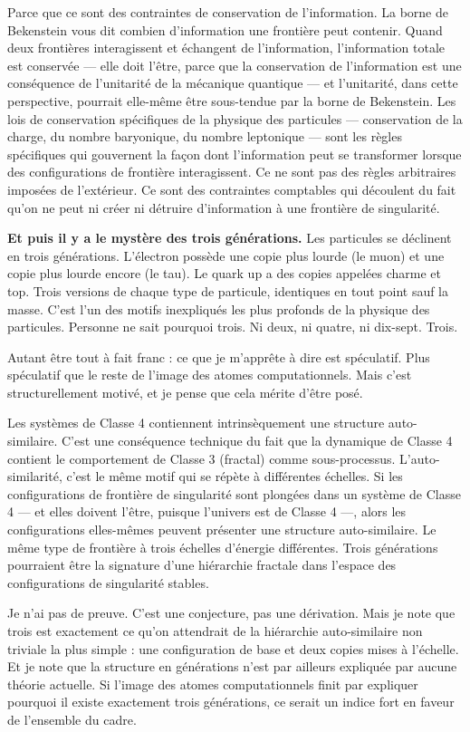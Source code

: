 \documentclass[11pt, twoside, openright]{book}
\begin{document}
Parce que ce sont des contraintes de conservation de l'information. La borne de Bekenstein vous dit combien d'information une frontière peut contenir. Quand deux frontières interagissent et échangent de l'information, l'information totale est conservée --- elle doit l'être, parce que la conservation de l'information est une conséquence de l'unitarité de la mécanique quantique --- et l'unitarité, dans cette perspective, pourrait elle-même être sous-tendue par la borne de Bekenstein. Les lois de conservation spécifiques de la physique des particules --- conservation de la charge, du nombre baryonique, du nombre leptonique --- sont les règles spécifiques qui gouvernent la façon dont l'information peut se transformer lorsque des configurations de frontière interagissent. Ce ne sont pas des règles arbitraires imposées de l'extérieur. Ce sont des contraintes comptables qui découlent du fait qu'on ne peut ni créer ni détruire d'information à une frontière de singularité.

\textbf{Et puis il y a le mystère des trois générations.} Les particules se déclinent en trois générations. L'électron possède une copie plus lourde (le muon) et une copie plus lourde encore (le tau). Le quark up a des copies appelées charme et top. Trois versions de chaque type de particule, identiques en tout point sauf la masse. C'est l'un des motifs inexpliqués les plus profonds de la physique des particules. Personne ne sait pourquoi trois. Ni deux, ni quatre, ni dix-sept. Trois.

Autant être tout à fait franc : ce que je m'apprête à dire est spéculatif. Plus spéculatif que le reste de l'image des atomes computationnels. Mais c'est structurellement motivé, et je pense que cela mérite d'être posé.

Les systèmes de Classe 4 contiennent intrinsèquement une structure auto-similaire. C'est une conséquence technique du fait que la dynamique de Classe 4 contient le comportement de Classe 3 (fractal) comme sous-processus. L'auto-similarité, c'est le même motif qui se répète à différentes échelles. Si les configurations de frontière de singularité sont plongées dans un système de Classe 4 --- et elles doivent l'être, puisque l'univers est de Classe 4 ---, alors les configurations elles-mêmes peuvent présenter une structure auto-similaire. Le même type de frontière à trois échelles d'énergie différentes. Trois générations pourraient être la signature d'une hiérarchie fractale dans l'espace des configurations de singularité stables.

Je n'ai pas de preuve. C'est une conjecture, pas une dérivation. Mais je note que trois est exactement ce qu'on attendrait de la hiérarchie auto-similaire non triviale la plus simple : une configuration de base et deux copies mises à l'échelle. Et je note que la structure en générations n'est par ailleurs expliquée par aucune théorie actuelle. Si l'image des atomes computationnels finit par expliquer pourquoi il existe exactement trois générations, ce serait un indice fort en faveur de l'ensemble du cadre.
\end{document}
